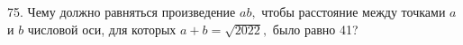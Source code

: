 75. Чему должно равняться произведение $ab,$ чтобы расстояние между точками $a$ и $b$ числовой оси, для которых $a+b=\sqrt{2022},$ было равно 41?\\
